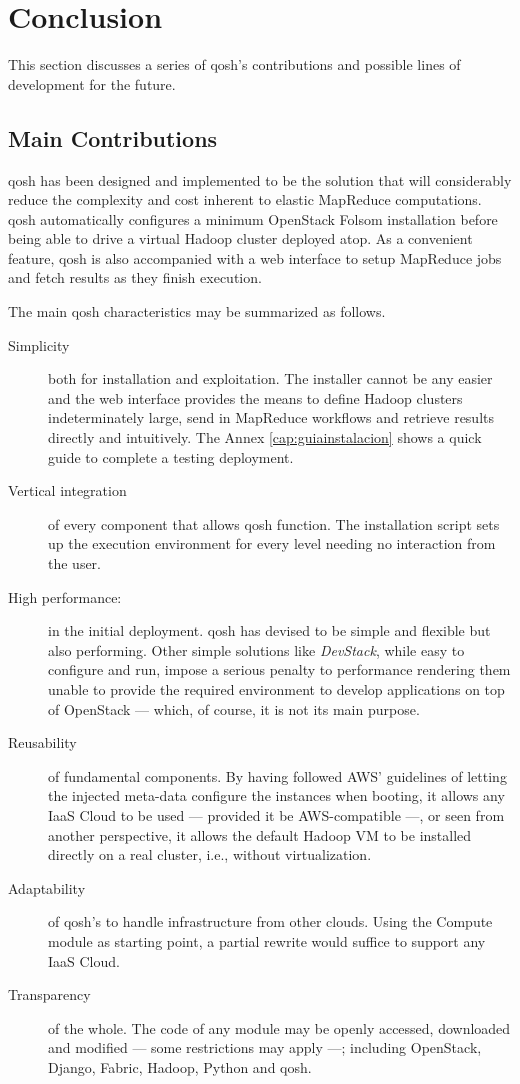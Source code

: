 \chapter*{Conclusion}\label{cap:aportaciones}
\noindent This section discusses a series of qosh's contributions and possible lines of development for the future.

\section*{Main Contributions}\label{sec:bondadesdeficiencias}
\noindent qosh has been designed and implemented to be the solution that will considerably reduce the complexity and cost inherent to elastic MapReduce computations. qosh automatically configures a minimum OpenStack Folsom installation before being able to drive a virtual Hadoop cluster deployed atop. As a convenient feature, qosh is also accompanied with a web interface to setup MapReduce jobs and fetch results as they finish execution.

The main qosh characteristics may be summarized as follows.

\begin{description}
    \item[Simplicity] both for installation and exploitation. The installer cannot be any easier and the web interface provides the means to define Hadoop clusters indeterminately large, send in MapReduce workflows and retrieve results directly and intuitively. The Annex \ref{cap:guiainstalacion} shows a quick guide to complete a testing deployment.
    \item[Vertical integration] of every component that allows qosh function. The installation script sets up the execution environment for every level needing no interaction from the user.
    \item[High performance:] in the initial deployment. qosh has devised to be simple and flexible but also performing. Other simple solutions like \emph{DevStack}, while easy to configure and run, impose a serious penalty to performance rendering them unable to provide the required environment to develop applications on top of OpenStack --- which, of course, it is not its main purpose.
    \item[Reusability] of fundamental components. By having followed AWS' guidelines of letting the injected meta-data configure the instances when booting, it allows any IaaS Cloud to be used --- provided it be AWS-compatible ---, or seen from another perspective, it allows the default Hadoop VM to be installed directly on a real cluster, i.e., without virtualization.
    \item[Adaptability] of qosh's to handle infrastructure from other clouds. Using the Compute module as starting point, a partial rewrite would suffice to support any IaaS Cloud.
    \item[Transparency] of the whole. The code of any module may be openly accessed, downloaded and modified --- some restrictions may apply ---; including OpenStack, Django, Fabric, Hadoop, Python and qosh.
\end{description}

